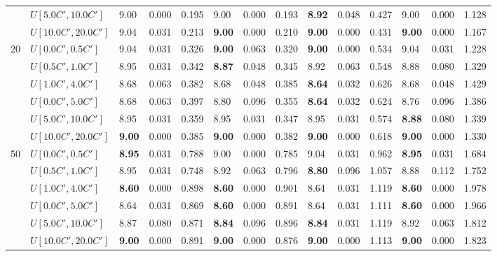 \begin{table}[h]
{\begin{tabular}{|l|l||l|l|l||l|l|l||l|l|l||l|l|l|}
       & $U[5.0C',10.0C']$ & 9.00 & 0.000 & 0.195 & 9.00 & 0.000 & 0.193 & \textbf{8.92} & 0.048 & 0.427 & 9.00 & 0.000 & 1.128 \\
       & $U[10.0C',20.0C']$ & 9.04 & 0.031 & 0.213 & \textbf{9.00} & 0.000 & 0.210 & \textbf{9.00} & 0.000 & 0.431 & \textbf{9.00} & 0.000 & 1.167 \\
      \hline\hline
      \multirow{6}{*}{20} & $U[0.0C',0.5C']$ & 9.04 & 0.031 & 0.326 & \textbf{9.00} & 0.063 & 0.320 & \textbf{9.00} & 0.000 & 0.534 & 9.04 & 0.031 & 1.228 \\
       & $U[0.5C',1.0C']$ & 8.95 & 0.031 & 0.342 & \textbf{8.87} & 0.048 & 0.345 & 8.92 & 0.063 & 0.548 & 8.88 & 0.080 & 1.329 \\
       & $U[1.0C',4.0C']$ & 8.68 & 0.063 & 0.382 & 8.68 & 0.048 & 0.385 & \textbf{8.64} & 0.032 & 0.626 & 8.68 & 0.048 & 1.429 \\
       & $U[0.0C',5.0C']$ & 8.68 & 0.063 & 0.397 & 8.80 & 0.096 & 0.355 & \textbf{8.64} & 0.032 & 0.624 & 8.76 & 0.096 & 1.386 \\
       & $U[5.0C',10.0C']$ & 8.95 & 0.031 & 0.359 & 8.95 & 0.031 & 0.347 & 8.95 & 0.031 & 0.574 & \textbf{8.88} & 0.080 & 1.339 \\
       & $U[10.0C',20.0C']$ & \textbf{9.00} & 0.000 & 0.385 & \textbf{9.00} & 0.000 & 0.382 & \textbf{9.00} & 0.000 & 0.618 & \textbf{9.00} & 0.000 & 1.330 \\
      \hline\hline
      \multirow{6}{*}{50} & $U[0.0C',0.5C']$ & \textbf{8.95} & 0.031 & 0.788 & 9.00 & 0.000 & 0.785 & 9.04 & 0.031 & 0.962 & \textbf{8.95} & 0.031 & 1.684 \\
       & $U[0.5C',1.0C']$ & 8.95 & 0.031 & 0.748 & 8.92 & 0.063 & 0.796 & \textbf{8.80} & 0.096 & 1.057 & 8.88 & 0.112 & 1.752 \\
       & $U[1.0C',4.0C']$ & \textbf{8.60} & 0.000 & 0.898 & \textbf{8.60} & 0.000 & 0.901 & 8.64 & 0.031 & 1.119 & \textbf{8.60} & 0.000 & 1.978 \\
       & $U[0.0C',5.0C']$ & 8.64 & 0.031 & 0.869 & \textbf{8.60} & 0.000 & 0.891 & 8.64 & 0.031 & 1.111 & \textbf{8.60} & 0.000 & 1.966 \\
       & $U[5.0C',10.0C']$ & 8.87 & 0.080 & 0.871 & \textbf{8.84} & 0.096 & 0.896 & \textbf{8.84} & 0.031 & 1.119 & 8.92 & 0.063 & 1.812 \\
       & $U[10.0C',20.0C']$ & \textbf{9.00} & 0.000 & 0.891 & \textbf{9.00} & 0.000 & 0.876 & \textbf{9.00} & 0.000 & 1.113 & \textbf{9.00} & 0.000 & 1.823 \\
      \hline
      \end{tabular}
      }
      \label{tab:pcpn120}\end{table}
	
